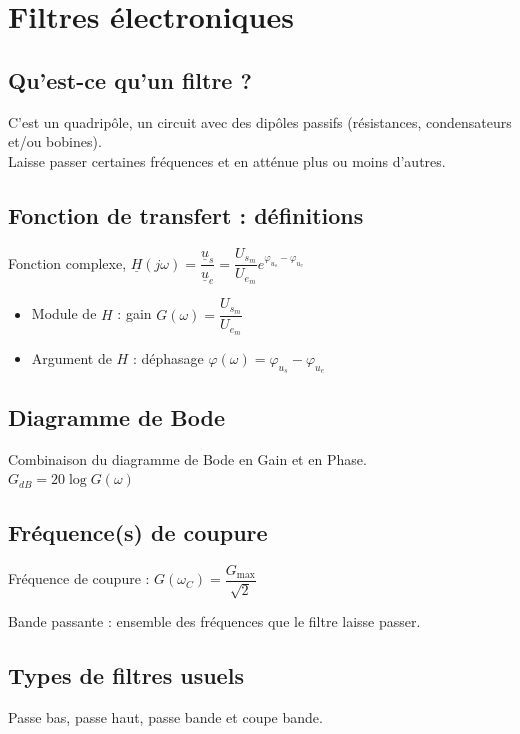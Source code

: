 \documentclass[13pt, twoside, a4paper, french]{report}
\begin{document}
    \chapter{Filtres électroniques}\label{ch:filtres-electroniques}

    \section{Qu'est-ce qu'un filtre ?}\label{sec:quest-ce-qu-un-filtre}

    C'est un quadripôle, un circuit avec des dipôles passifs (résistances, condensateurs et/ou bobines).\\
    Laisse passer certaines fréquences et en atténue plus ou moins d'autres.

    \section{Fonction de transfert : définitions}\label{sec:fonction-de-trandfert-definitions}

    Fonction complexe, $\underline{H}(j\omega) = \dfrac{\underline{u}_s}{\underline{u}_e} = \dfrac{U_s_m}{U_e_m} e^{\varphi_{u_s} - \varphi_{u_e}}$\\

    \begin{itemize}
        \item Module de $H$ : gain $G(\omega) = \dfrac{U_s_m}{U_e_m}$
        \item Argument de $H$ : déphasage $\varphi(\omega) = \varphi_{u_s} - \varphi_{u_e}$
    \end{itemize}

    \section{Diagramme de Bode}\label{sec:diagramme-de-bode}

    Combinaison du diagramme de Bode en Gain et en Phase.\\

    $G_{dB} = 20 \log G(\omega)$

    \section{Fréquence(s) de coupure}\label{sec:frequence-s-de-coupure}

    Fréquence de coupure : $G(\omega_C) = \dfrac{G_{\max}}{\sqrt{2}}$

    Bande passante : ensemble des fréquences que le filtre laisse passer.\\

    \section{Types de filtres usuels}\label{sec:types-de-filtres-usuels}

    Passe bas, passe haut, passe bande et coupe bande.\\
\end{document}
